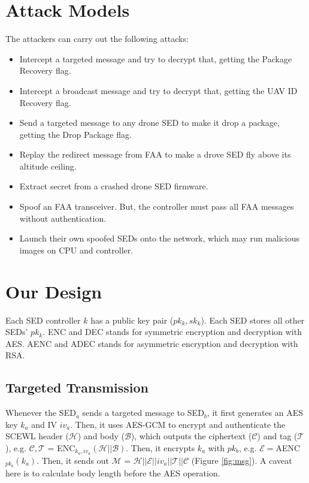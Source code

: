 \documentclass[11pt,oneside,onecolumn,letterpaper]{article}
\begin{document}
\section{Attack Models}

The attackers can carry out the following attacks:

\begin{itemize}
	\item Intercept a targeted message and try to decrypt that, getting the Package Recovery flag.

	\item Intercept a broadcast message and try to decrypt that, getting the UAV ID Recovery flag.	
	
	\item Send a targeted message to any drone SED to make it drop a package, getting the Drop Package flag.		
	
	\item Replay the redirect message from FAA to make a drove SED fly above its altitude ceiling.
	
	\item Extract secret from a crashed drone SED firmware.  
	
	\item Spoof an FAA transceiver. But, the controller must pass all FAA messages without authentication.
	
	\item Launch their own spoofed SEDs onto the network, which may run malicious images on CPU and controller.
\end{itemize}

\section{Our Design}
Each SED controller $k$ has a public key pair ($pk_k, sk_k$).
Each SED stores all other SEDs' $pk_k$.
ENC and DEC stands for symmetric encryption and decryption with AES.
AENC and ADEC stands for asymmetric encryption and decryption with RSA.

\subsection{Targeted Transmission}
Whenever the SED$_a$ sends a targeted message to SED$_b$, it first generates an AES key $k_a$ and IV $iv_a$. 
Then, it uses AES-GCM to encrypt and authenticate the SCEWL header ($\mathcal{H}$) and body ($\mathcal{B}$), which outputs the ciphertext ($\mathcal{C}$) and tag ($\mathcal{T}$), e.g. $\mathcal{C}, \mathcal{T}$ = ENC$_{k_a, iv_a}(\mathcal{H} || \mathcal{B})$.
Then, it encrypts $k_a$ with $pk_b$, e.g. $\mathcal{E}=$AENC$_{pk_b}(k_a)$.
Then, it sends out $\mathcal{M}$ = $\mathcal{H} || \mathcal{E}||iv_a||\mathcal{T}||\mathcal{C}$ (Figure \ref{fig:msg}).
A caveat here is to calculate body length before the AES operation.
\end{document}
